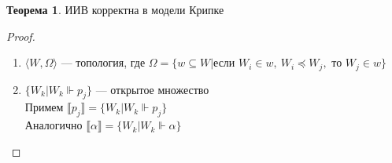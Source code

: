 \documentclass[oneside]{book}
\theoremstyle{plain}
\theoremstyle{remark}
\theoremstyle{definition}
\newtheorem{theorem}{Теорема}[section]
\begin{document}
\begin{theorem}
ИИВ корректна в модели Крипке
\end{theorem}
\begin{proof}
\begin{enumerate}
\item \(\langle W, \Omega \rangle\) --- топология, где \(\Omega = \{w \subseteq W | \text{если }W_i \in w,\ W_i \preceq W_j,\text{ то } W_j \in w\}\) \\
\item \(\{W_k | W_k \Vdash p_j\}\) --- открытое множество \\
Примем \(\llbracket p_j \rrbracket = \{W_k | W_k \Vdash p_j\}\) \\
Аналогично \(\llbracket \alpha \rrbracket = \{W_k | W_k \Vdash \alpha\}\)
\end{enumerate}
\end{proof}
\end{document}
